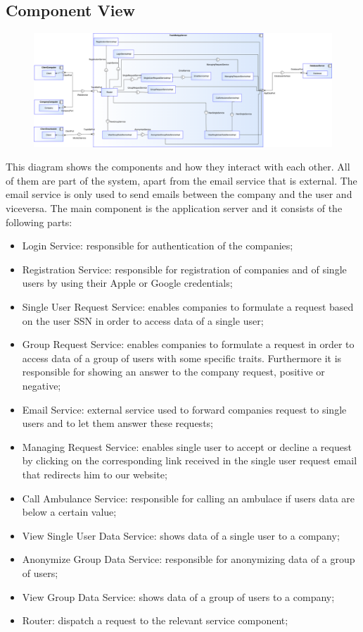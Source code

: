 \documentclass{article}
\begin{document}
\subsection{Component View}
\begin{figure}[h!]
\centering
    \textbf{}\par\medskip
	\includegraphics[width= \linewidth]{comp.png}
\end{figure}
This diagram shows the components and how they interact with each other. All of them are part of the system, apart from the email service that is external. The email service is only used to send emails between the company and the user and viceversa. \newline
The main component is the application server and it consists of the following parts:
\begin{itemize}
\item Login Service: responsible for authentication of the companies;
\item Registration Service: responsible for registration of companies and of single users by using their Apple or Google credentials;
\item Single User Request Service: enables companies to formulate a request based on the user SSN in order to access data of a single user;
\item Group Request Service: enables companies to formulate a request in order to access data of a group of users with some specific traits. Furthermore it is responsible for showing an answer to the company request, positive or negative;
\item Email Service: external service used to forward companies request to single users and to let them answer these requests;
\item Managing Request Service: enables single user to accept or decline a request by clicking on the corresponding link received in the single user request email that redirects him to our website;
\item Call Ambulance Service: responsible for calling an ambulace if users data are below a certain value;
\item View Single User Data Service: shows data of a single user to a company;
\item Anonymize Group Data Service: responsible for anonymizing data of a group of users;
\item View Group Data Service: shows data of a group of users to a company;
\item Router: dispatch a request to the relevant service component;
\end{itemize}
\end{document}
